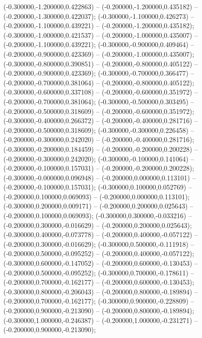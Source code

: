  (-0.300000,-1.200000,0.422863) -- (-0.200000,-1.200000,0.435182) -- (-0.200000,-1.300000,0.422037);
 (-0.300000,-1.100000,0.426273) -- (-0.200000,-1.100000,0.439221) -- (-0.200000,-1.200000,0.435182);
 (-0.300000,-1.000000,0.421537) -- (-0.200000,-1.000000,0.435007) -- (-0.200000,-1.100000,0.439221);
 (-0.300000,-0.900000,0.409464) -- (-0.200000,-0.900000,0.423369) -- (-0.200000,-1.000000,0.435007);
 (-0.300000,-0.800000,0.390851) -- (-0.200000,-0.800000,0.405122) -- (-0.200000,-0.900000,0.423369);
 (-0.300000,-0.700000,0.366477) -- (-0.200000,-0.700000,0.381064) -- (-0.200000,-0.800000,0.405122);
 (-0.300000,-0.600000,0.337108) -- (-0.200000,-0.600000,0.351972) -- (-0.200000,-0.700000,0.381064);
 (-0.300000,-0.500000,0.303495) -- (-0.200000,-0.500000,0.318609) -- (-0.200000,-0.600000,0.351972);
 (-0.300000,-0.400000,0.266372) -- (-0.200000,-0.400000,0.281716) -- (-0.200000,-0.500000,0.318609);
 (-0.300000,-0.300000,0.226458) -- (-0.200000,-0.300000,0.242020) -- (-0.200000,-0.400000,0.281716);
 (-0.300000,-0.200000,0.184459) -- (-0.200000,-0.200000,0.200228) -- (-0.200000,-0.300000,0.242020);
 (-0.300000,-0.100000,0.141064) -- (-0.200000,-0.100000,0.157031) -- (-0.200000,-0.200000,0.200228);
 (-0.300000,-0.000000,0.096948) -- (-0.200000,0.000000,0.113101) -- (-0.200000,-0.100000,0.157031);
 (-0.300000,0.100000,0.052769) -- (-0.200000,0.100000,0.069093) -- (-0.200000,0.000000,0.113101);
 (-0.300000,0.200000,0.009171) -- (-0.200000,0.200000,0.025643) -- (-0.200000,0.100000,0.069093);
 (-0.300000,0.300000,-0.033216) -- (-0.200000,0.300000,-0.016629) -- (-0.200000,0.200000,0.025643);
 (-0.300000,0.400000,-0.073778) -- (-0.200000,0.400000,-0.057122) -- (-0.200000,0.300000,-0.016629);
 (-0.300000,0.500000,-0.111918) -- (-0.200000,0.500000,-0.095252) -- (-0.200000,0.400000,-0.057122);
 (-0.300000,0.600000,-0.147052) -- (-0.200000,0.600000,-0.130453) -- (-0.200000,0.500000,-0.095252);
 (-0.300000,0.700000,-0.178611) -- (-0.200000,0.700000,-0.162177) -- (-0.200000,0.600000,-0.130453);
 (-0.300000,0.800000,-0.206043) -- (-0.200000,0.800000,-0.189894) -- (-0.200000,0.700000,-0.162177);
 (-0.300000,0.900000,-0.228809) -- (-0.200000,0.900000,-0.213090) -- (-0.200000,0.800000,-0.189894);
 (-0.300000,1.000000,-0.246387) -- (-0.200000,1.000000,-0.231271) -- (-0.200000,0.900000,-0.213090);
